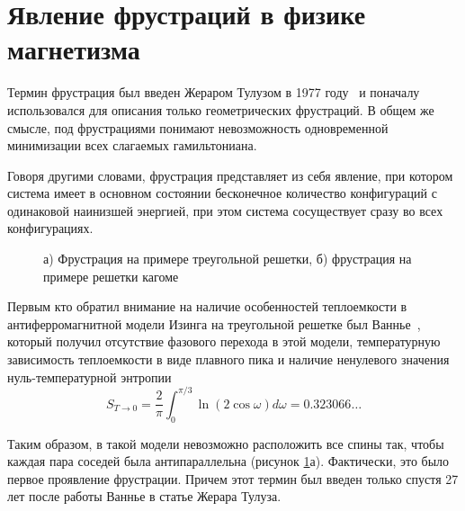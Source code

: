 \section{Явление фрустраций в физике магнетизма}\label{sec:ch1/sec3}

Термин \guillemotleft фрустрация\guillemotright \hspace{1pt} был введен Жераром Тулузом в 1977 году~\cite{toulouse1977, vannimenus1977} и поначалу использовался для описания только геометрических фрустраций. 
В общем же смысле, под фрустрациями понимают невозможность одновременной минимизации всех слагаемых гамильтониана.

Говоря другими словами, фрустрация представляет из себя явление, при котором система имеет в основном состоянии бесконечное количество конфигураций с одинаковой наинизшей энергией, при этом система сосуществует сразу во всех конфигурациях.

 \begin{figure}[h]
 	\begin{minipage}[h]{0.49\linewidth}
 	\end{minipage}
 	\hfill
 	\begin{minipage}[h]{0.49\linewidth}
 	\end{minipage}
 	\caption{а) Фрустрация на примере треугольной решетки, б) фрустрация на примере решетки кагоме}
 	\label{frust1}
 \end{figure}

Первым кто обратил внимание на наличие особенностей теплоемкости в антиферромагнитной модели Изинга на треугольной решетке был Ваннье~\cite{wannier1950}, который получил отсутствие фазового перехода в этой модели, температурную зависимость теплоемкости в виде плавного пика и наличие ненулевого значения нуль-температурной энтропии 
\begin{equation}
S_{T\rightarrow 0} = \frac{2}{\pi} \int_{0}^{\pi/3} \ln (2 \cos \omega) d\omega = 0.323066\dots
\label{wannier}
\end{equation}

Таким образом, в такой модели невозможно расположить все спины так, чтобы каждая пара соседей была антипараллельна (рисунок \ref{frust1}а). Фактически, это было первое проявление фрустрации. Причем этот термин был введен только спустя 27 лет после работы Ваннье в статье Жерара Тулуза.


